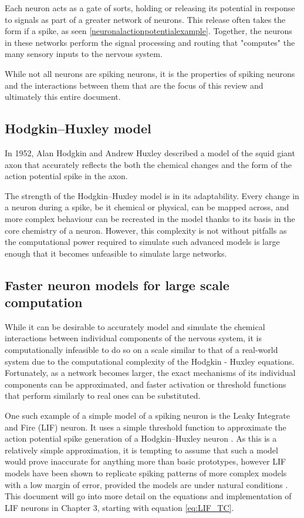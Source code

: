 Each neuron acts as a gate of sorts, holding or releasing its potential in
response to signals as part of a greater network of neurons. This release often
takes the form if a spike, as seen \ref{neuronalactionpotentialexample}.
Together, the neurons in these networks perform the signal processing and
routing that "computes" the many sensory inputs to the nervous system.
\autocite{koch_biophysics_2004}

While not all neurons are spiking neurons, it is the properties of spiking
neurons and the interactions between them that are the focus of this review and
ultimately this entire document.

\subsection{Hodgkin–Huxley model}

In 1952, Alan Hodgkin and Andrew Huxley described a model of the squid giant
axon that accurately reflects the both the chemical changes and the form of the
action potential spike in the axon. \autocite{hodgkin_quantitative_1952}

The strength of the Hodgkin–Huxley model is in its adaptability. Every change in
a neuron during a spike, be it chemical or physical, can be mapped across, and
more complex behaviour can be recreated in the model thanks to its basis in the
core chemistry of a neuron. However, this complexity is not without pitfalls as
the computational power required to simulate such advanced models is large
enough that it becomes unfeasible to simulate large networks.

\subsection{Faster neuron models for large scale computation}

While it can be desirable to accurately model and simulate the chemical
interactions between individual components of the nervous system, it is
computationally infeasible to do so on a scale similar to that of a real-world
system due to the computational complexity of the Hodgkin - Huxley equations.
Fortunately, as a network becomes larger, the exact mechanisms of its individual
components can be approximated, and faster activation or threshold functions
that perform similarly to real ones can be substituted.

One such example of a simple model of a spiking neuron is the Leaky Integrate
and Fire (LIF) neuron. It uses a simple threshold function to approximate the
action potential spike generation of a Hodgkin–Huxley neuron
\autocite{trappenberg_fundamentals_2009}. As this is a relatively simple
approximation, it is tempting to assume that such a model would prove inaccurate
for anything more than basic prototypes, however LIF models have been shown to
replicate spiking patterns of more complex models with a low margin of error,
provided the models are under natural conditions
\autocite{teeter_generalized_2018}. This document will go into more detail on
the equations and implementation of LIF neurons in Chapter 3, starting with
equation \eqref{eq:LIF_TC}.
